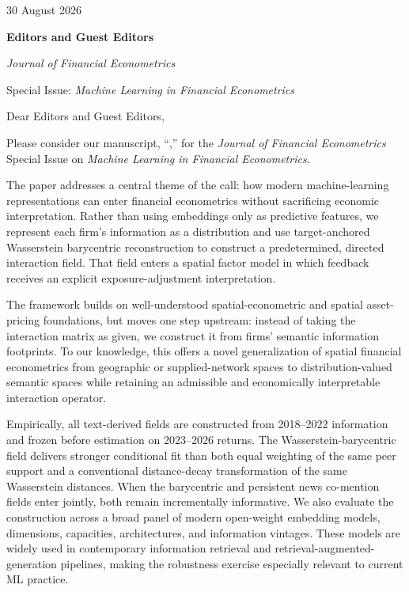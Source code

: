 \documentclass[11pt]{article}
\begin{document}
\fontsize{10.5pt}{12.35pt}\selectfont

\noindent\hfill 30 August 2026\par

\begingroup
\setlength{\parskip}{0pt}
\textbf{Editors and Guest Editors}

\textit{Journal of Financial Econometrics}

Special Issue: \textit{Machine Learning in Financial Econometrics}
\endgroup

\smallskip

Dear Editors and Guest Editors,

Please consider our manuscript, ``\textbf{\papertitle},'' for the
\textit{Journal of Financial Econometrics} Special Issue on \textit{Machine
Learning in Financial Econometrics}.

The paper addresses a central theme of the call: how modern machine-learning
representations can enter financial econometrics without sacrificing economic
interpretation.
Rather than using embeddings only as predictive features, we represent each
firm's information as a distribution and use target-anchored Wasserstein
barycentric reconstruction to construct a predetermined, directed interaction field.
That field enters a spatial factor model in which feedback receives an
explicit exposure-adjustment interpretation.

The framework builds on well-understood spatial-econometric and spatial
asset-pricing foundations, but moves one step upstream: instead of taking the
interaction matrix as given, we construct it from firms' semantic information
footprints.
To our knowledge, this offers a novel generalization of spatial financial
econometrics from geographic or supplied-network spaces to
distribution-valued semantic spaces while retaining an admissible and
economically interpretable interaction operator.

Empirically, all text-derived fields are constructed from 2018--2022
information and frozen before estimation on 2023--2026 returns.
The Wasserstein-barycentric field delivers stronger conditional fit than both
equal weighting of the same peer support and a conventional distance-decay
transformation of the same Wasserstein distances.
When the barycentric and persistent news co-mention fields enter jointly,
both remain incrementally informative.
We also evaluate the construction across a broad panel of modern open-weight
embedding models, dimensions, capacities, architectures, and information vintages.
These models are widely used in contemporary information retrieval and
retrieval-augmented-generation pipelines, making the robustness exercise
especially relevant to current ML practice.
\end{document}
